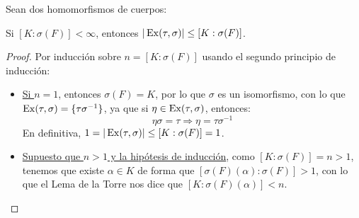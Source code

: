 \begin{prop}[Extensión II]\label{prop:extension_2}%
    Sean dos homomorfismos de cuerpos:
    \begin{figure}[H]
        \centering
    \end{figure}
    Si $[K:\sigma(F)]<\infty$, entonces $|\operatorname{Ex}(\tau,\sigma)| \leq [K:\sigma(F)]$.
    \begin{proof}
        Por inducción sobre $n = [K:\sigma(F)]$ usando el segundo principio de inducción:
        \begin{itemize}
            \item \underline{Si $n=1$}, entonces $\sigma(F) = K$, por lo que $\sigma$ es un isomorfismo, con lo que $\operatorname{Ex}(\tau,\sigma) = \{\tau \sigma^{-1}\}$, ya que si $\eta \in \operatorname{Ex}(\tau, \sigma)$, entonces:
                \begin{equation*}
                    \eta\sigma = \tau \Longrightarrow \eta = \tau\sigma^{-1}
                \end{equation*}
                En definitiva, $1 = |\operatorname{Ex}(\tau,\sigma)| \leq [K:\sigma(F)] = 1$.
            \item \underline{Supuesto que $n>1$ y la hipótesis de inducción}, como $[K:\sigma(F)] = n > 1$, tenemos que existe $\alpha\in K$ de forma que $[\sigma(F)(\alpha):\sigma(F)] > 1$, con lo que el Lema de la Torre nos dice que $[K:\sigma(F)(\alpha)] < n$. 


\end{itemize}
\end{proof}
\end{prop}
